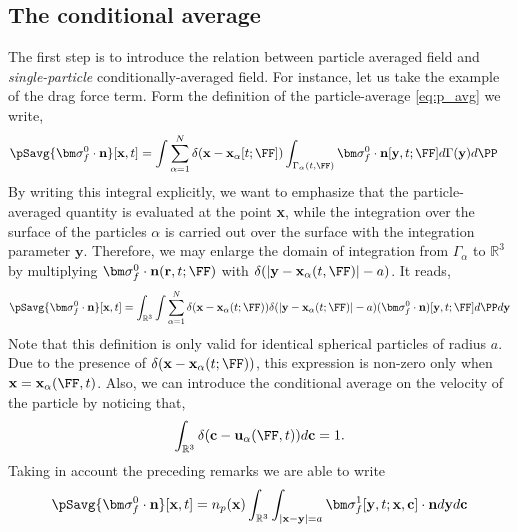 
\subsection{The conditional average}
The first step is to introduce the relation between particle averaged field and \textit{single-particle} conditionally-averaged field.
For instance, let us take the example of the drag force term. 
Form the definition of the particle-average \ref{eq:p_avg} we write,
\begin{align}
    \pSavg{\bm\sigma_f^0\cdot\textbf{n}}[\textbf{x},t]
    &= \int \sum_{\alpha=1}^N \delta(\textbf{x}-\textbf{x}_\alpha[t; \FF])
    \int_{\Gamma_\alpha(t,\FF)}
    \bm\sigma_f^0\cdot\textbf{n}[\textbf{y},t;\FF]
    d\Gamma(\textbf{y}) d\PP
\end{align}
By writing this integral explicitly, we want to emphasize that the particle-averaged quantity is evaluated at the point \textbf{x}, while the integration over the surface of the particles $\alpha$ is carried out over the surface with the integration parameter $\textbf{y}$.
Therefore, we may enlarge the domain of integration from $\Gamma_\alpha$ to $\mathbb{R}^3$ by multiplying $\bm\sigma_f^0\cdot\textbf{n}(\textbf{r},t;\FF)$ with $\delta(|\textbf{y} - \textbf{x}_\alpha(t,\FF)| - a)$. 
It reads, 
\begin{equation}
    \pSavg{\bm\sigma_f^0\cdot\textbf{n}}[\textbf{x},t]
    = 
    \int_{\mathbb{R}^3}
    \int
     \sum_{\alpha=1}^N 
     \delta(\textbf{x}-\textbf{x}_\alpha(t; \FF))
    \delta(|\textbf{y} - \textbf{x}_{\alpha}(t;\FF)|-a)
    (\bm\sigma_f^0\cdot\textbf{n})[\textbf{y},t;\FF]
    d\PP
    d\textbf{y}
\end{equation}
Note that this definition is only valid for identical spherical particles of radius $a$. 
Due to the presence of $\delta(\textbf{x}-\textbf{x}_\alpha(t; \FF))$, this expression is non-zero only when $\textbf{x} = \textbf{x}_\alpha(\FF,t)$. 
Also, we can introduce the conditional average on the velocity of the particle by noticing that, 
\begin{equation*}
    \int_{\mathbb{R}^3} \delta(\textbf{c} - \textbf{u}_\alpha(\FF,t)) d\textbf{c} = 1. 
\end{equation*}
Taking in account the preceding remarks we are able to write
\begin{equation}
    \pSavg{\bm\sigma_f^0\cdot\textbf{n}}[\textbf{x},t]
    =
    n_p(\textbf{x})
    \int_{\mathbb{R}^3}
    \int_{|\textbf{x}-\textbf{y}|=a}
    \bm\sigma_f^1[\textbf{y},t;\textbf{x},\textbf{c}] \cdot \textbf{n}
    d\textbf{y}
    d\textbf{c}
    \label{eq:conditionally_averaged}
\end{equation}

